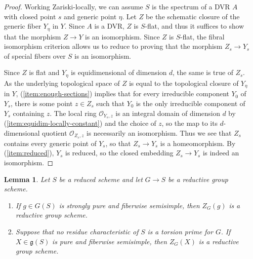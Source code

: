 \documentclass[11pt,reqno]{amsart}
\newtheorem{lemma}[theorem]{Lemma}
\theoremstyle{definition}
\newcommand{\sO}{{\mathscr O}}
\begin{document}
\begin{proof}
Working Zariski-locally, we can assume $S$ is the spectrum of a DVR $A$ with closed point $s$ and generic point $\eta$. Let $Z$ be the schematic closure of the generic fiber $Y_\eta$ in $Y$. Since $A$ is a DVR, $Z$ is $S$-flat, and thus it suffices to show that the morphism $Z \to Y$ is an isomorphism. Since $Z$ is $S$-flat, the fibral isomorphism criterion \cite[IV\textsubscript{4}, Cor.\ 17.9.5]{EGA} allows us to reduce to proving that the morphism $Z_s \to Y_s$ of special fibers over $S$ is an isomorphism. \smallskip

Since $Z$ is flat and $Y_\eta$ is equidimensional of dimension $d$, the same is true of $Z_s$. As the underlying topological space of $Z$ is equal to the topological closure of $Y_\eta$ in $Y$, (\ref{item:enough-sections}) implies that for every irreducible component $Y_0$ of $Y_s$, there is some point $z \in Z_s$ such that $Y_0$ is the only irreducible component of $Y_s$ containing $z$. The local ring $\sO_{Y_s, z}$ is an integral domain of dimension $d$ by (\ref{item:equidim-locally-constant}) and the choice of $z$, so the map to its $d$-dimensional quotient $\sO_{Z_s, z}$ is necessarily an isomorphism. Thus we see that $Z_s$ contains every generic point of $Y_s$, so that $Z_s \to Y_s$ is a homeomorphism. By (\ref{item:reduced}), $Y_s$ is reduced, so the closed embedding $Z_s \to Y_s$ is indeed an isomorphism.
\end{proof}

\begin{lemma}\label{lemma:semisimple-centralizer-is-reductive}
Let $S$ be a reduced scheme and let $G \to S$ be a reductive group scheme.
\begin{enumerate}
    \item If $g \in G(S)$ is strongly pure and fiberwise semisimple, then $Z_G(g)$ is a reductive group scheme.
    \item Suppose that no residue characteristic of $S$ is a torsion prime for $G$. If $X \in \mathfrak{g}(S)$ is pure and fiberwise semisimple, then $Z_G(X)$ is a reductive group scheme.
\end{enumerate}
\end{lemma}
\end{document}
